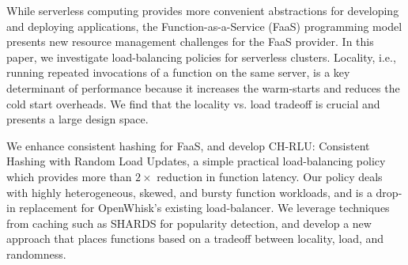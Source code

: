 While serverless computing provides more convenient abstractions for developing and deploying applications, the Function-as-a-Service (FaaS) programming model presents new resource management challenges for the FaaS provider. 
In this paper, we investigate load-balancing policies for serverless clusters.
Locality, i.e., running repeated invocations of a function on the same server, is a key determinant of performance because it increases the warm-starts and reduces the cold start overheads. 
We find that the locality vs. load tradeoff is crucial and presents a large design space. 

We enhance consistent hashing for FaaS, and develop CH-RLU: Consistent Hashing with Random Load Updates, a simple practical load-balancing policy which provides more than $2\times$ reduction in function latency. 
Our policy deals with highly heterogeneous, skewed, and bursty function workloads, and is a drop-in replacement for OpenWhisk's existing load-balancer.
We leverage techniques from caching such as SHARDS for popularity detection, and develop a new approach that places functions based on a tradeoff between locality, load, and randomness. 





